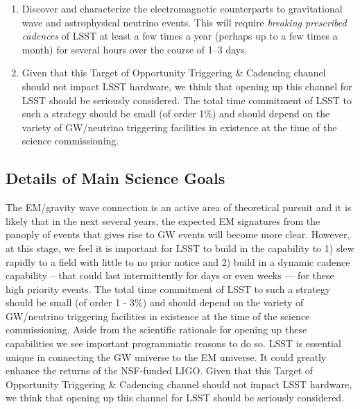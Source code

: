 \documentclass [11pt]{article}
\begin{document}
\begin{enumerate}

\item
Discover and characterize the electromagnetic counterparts to gravitational wave and astrophysical neutrino events. This will require {\it breaking prescribed cadences} of LSST at least a few times a year (perhaps up to a few times a month) for several hours over the course of 1--3 days.

\item Given that this Target of Opportunity Triggering \& Cadencing channel should not impact LSST hardware, we think that opening up this channel for LSST should be seriously considered. The total time commitment of LSST to such a strategy should be small (of order 1\%) and should depend on the variety of GW/neutrino triggering facilities in existence at the time of the science commissioning. 


\end{enumerate}

\subsection{Details of Main Science Goals}

%
The EM/gravity wave connection is an active area of theoretical pursuit and it is likely that in the next several years, the expected EM signatures from the panoply of events that gives rise to GW events will become more clear. However, at this stage, we feel it is important for LSST to build in the capability to 1) slew rapidly to a field with little to no prior notice and 2) build in a dynamic cadence capability -- that could last intermittently for days or even weeks --- for these high priority events. The total time commitment of LSST to such a strategy should be small (of order 1 - 3\%) and should depend on the variety of GW/neutrino triggering facilities in existence at the time of the science commissioning. Aside from the scientific rationale for opening up these capabilities we see important programmatic reasons to do so. LSST is essential unique in connecting the GW universe to the EM universe. It could greatly enhance the returns of the NSF-funded LIGO. Given that this Target of Opportunity Triggering \& Cadencing channel should not impact LSST hardware, we think that opening up this channel for LSST should be seriously considered.
\end{document}
